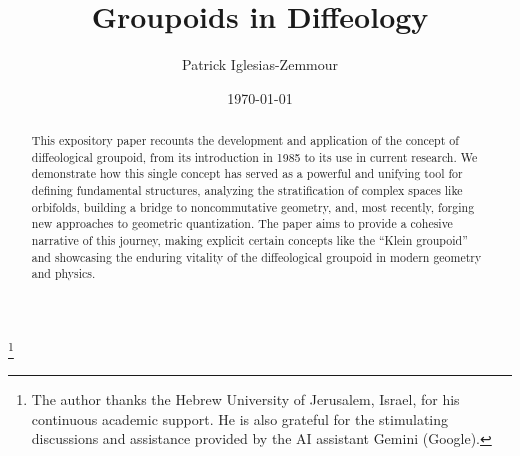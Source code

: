 \documentclass[10pt,reqno,letterpaper,twoside]{amsart}
\theoremstyle{article}
\begin{document}
  
  
  \title{Groupoids in Diffeology}
  
  \author{Patrick Iglesias-Zemmour}
  \address{Patrick Iglesias-Zemmour,
  Einstein Institute of Mathematics,
  The Hebrew University of Jerusalem,
  Edmond J. Safra Campus,
  Givat Ram,
  $9190401$ Jerusalem,
  Israel.
  }
  \thanks{The author thanks the Hebrew University of Jerusalem, Israel, for his continuous academic support. He is also grateful for the stimulating discussions and assistance provided by the AI assistant Gemini (Google).}
  
  \date{\today}
  
  
  
  \maketitle
  
  
  \begin{abstract}
    This expository paper recounts the development and application of the concept of diffeological groupoid,
    from its introduction in 1985 to its use in current research.
    We demonstrate how this single concept has served as a powerful and unifying tool for defining fundamental structures,
    analyzing the stratification of complex spaces like orbifolds,
    building a bridge to noncommutative geometry, and, most recently,
    forging new approaches to geometric quantization.
    The paper aims to provide a cohesive narrative of this journey,
    making explicit certain concepts like the ``Klein groupoid'' and showcasing the enduring vitality of the diffeological groupoid in modern geometry and physics.
  \end{abstract}
  
  
\end{document}
